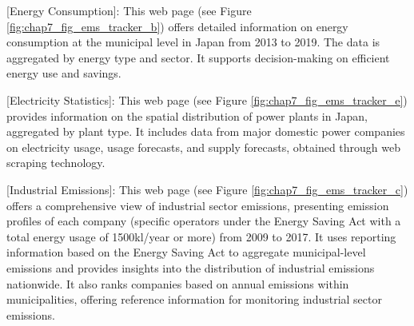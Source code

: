 [Energy Consumption]: This web page (see Figure \ref{fig:chap7_fig_ems_tracker_b}) offers detailed information on energy consumption at the municipal level in Japan from 2013 to 2019. The data is aggregated by energy type and sector. It supports decision-making on efficient energy use and savings.\par

[Electricity Statistics]: This web page (see Figure \ref{fig:chap7_fig_ems_tracker_e}) provides information on the spatial distribution of power plants in Japan, aggregated by plant type. It includes data from major domestic power companies on electricity usage, usage forecasts, and supply forecasts, obtained through web scraping technology.\par

[Industrial Emissions]: This web page (see Figure \ref{fig:chap7_fig_ems_tracker_c}) offers a comprehensive view of industrial sector emissions, presenting emission profiles of each company (specific operators under the Energy Saving Act with a total energy usage of 1500kl/year or more) from 2009 to 2017. It uses reporting information based on the Energy Saving Act to aggregate municipal-level emissions and provides insights into the distribution of industrial emissions nationwide. It also ranks companies based on annual emissions within municipalities, offering reference information for monitoring industrial sector emissions.\par

